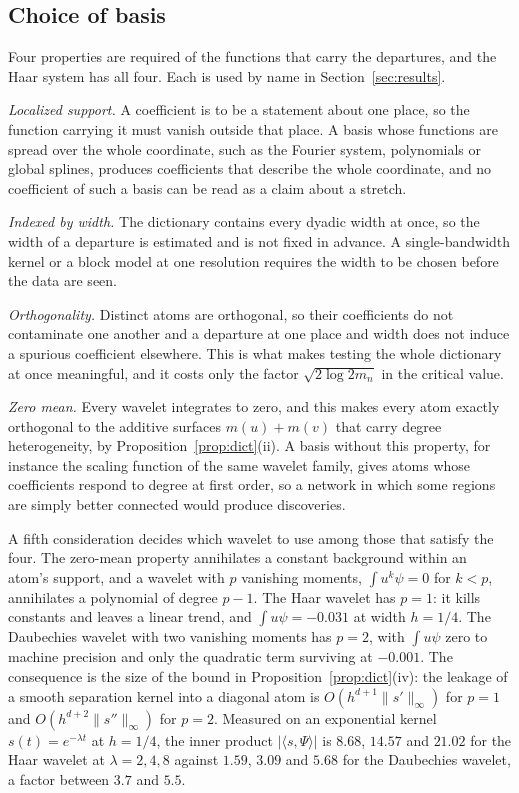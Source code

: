 \documentclass[11pt]{article}
\theoremstyle{definition}
\newcommand{\1}{\mathbf 1}\newcommand{\op}{\operatorname}
\begin{document}
\subsection{Choice of basis}                                 \label{sec:whybasis}

Four properties are required of the functions that carry the departures, and
the Haar system has all four.  Each is used by name in
Section~\ref{sec:results}.

\emph{Localized support.}  A coefficient is to be a statement about one place,
so the function carrying it must vanish outside that place.  A basis whose
functions are spread over the whole coordinate, such as the Fourier system,
polynomials or global splines, produces coefficients that describe the whole
coordinate, and no coefficient of such a basis can be read as a claim about a
stretch.

\emph{Indexed by width.}  The dictionary contains every dyadic width at once,
so the width of a departure is estimated and is not fixed in advance.  A
single-bandwidth kernel or a block model at one resolution requires the width
to be chosen before the data are seen.

\emph{Orthogonality.}  Distinct atoms are orthogonal, so their coefficients do
not contaminate one another and a departure at one place and width does not
induce a spurious coefficient elsewhere.  This is what makes testing the whole
dictionary at once meaningful, and it costs only the factor
$\sqrt{2\log 2m_n}$ in the critical value.

\emph{Zero mean.}  Every wavelet integrates to zero, and this makes every atom
exactly orthogonal to the additive surfaces $m(u)+m(v)$ that carry degree
heterogeneity, by Proposition~\ref{prop:dict}(ii).  A basis without this
property, for instance the scaling function of the same wavelet family, gives
atoms whose coefficients respond to degree at first order, so a network in
which some regions are simply better connected would produce discoveries.

A fifth consideration decides which wavelet to use among those that satisfy
the four.  The zero-mean property annihilates a constant background within an
atom's support, and a wavelet with $p$ vanishing moments,
$\int u^{k}\psi=0$ for $k<p$, annihilates a polynomial of degree $p-1$.  The
Haar wavelet has $p=1$: it kills constants and leaves a linear trend, and
$\int u\psi=-0.031$ at width $h=1/4$.  The Daubechies wavelet with two
vanishing moments has $p=2$, with $\int u\psi$ zero to machine precision and
only the quadratic term surviving at $-0.001$.  The consequence is the size of
the bound in Proposition~\ref{prop:dict}(iv): the leakage of a smooth
separation kernel into a diagonal atom is $O(h^{d+1}\|s'\|_\infty)$ for $p=1$
and $O(h^{d+2}\|s''\|_\infty)$ for $p=2$.  Measured on an exponential kernel
$s(t)=e^{-\lambda t}$ at $h=1/4$, the inner product $|\langle s,\Psi\rangle|$
is $8.68$, $14.57$ and $21.02$ for the Haar wavelet at $\lambda=2,4,8$ against
$1.59$, $3.09$ and $5.68$ for the Daubechies wavelet, a factor between $3.7$
and $5.5$.
\end{document}
